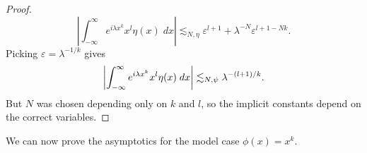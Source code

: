 \begin{proof}
  \[ \left| \int_{-\infty}^\infty e^{i \lambda x^k} x^l \eta(x)\; dx \right| \lesssim_{N,\eta} \varepsilon^{l+1} + \lambda^{-N} \varepsilon^{l+1-Nk}. \]
  Picking $\varepsilon = \lambda^{-1/k}$ gives
  \[ \left| \int_{-\infty}^\infty e^{i \lambda x^k} x^l \eta(x)\; dx \right| \lesssim_{N,\psi} \lambda^{-(l+1)/k}. \qedhere \]
  But $N$ was chosen depending only on $k$ and $l$, so the implicit constants depend on the correct variables.
\end{proof}


We can now prove the asymptotics for the model case $\phi(x) = x^k$.

